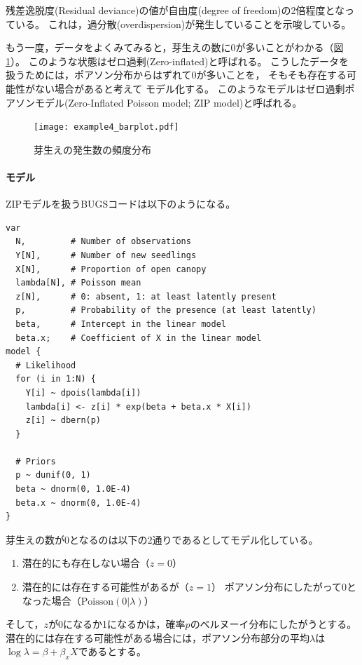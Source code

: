 \documentclass[11pt,uplatex]{jsarticle}
\begin{document}
残差逸脱度(Residual deviance)の値が自由度(degree of freedom)の2倍程度となっている。
これは，過分散(overdispersion)が発生していることを示唆している。

もう一度，データをよくみてみると，芽生えの数に0が多いことがわかる（図\ref{example4_barplot}）。
このような状態はゼロ過剰(Zero-inflated)と呼ばれる。
こうしたデータを扱うためには，ポアソン分布からはずれて0が多いことを，
そもそも存在する可能性がない場合があると考えて
モデル化する。
このようなモデルはゼロ過剰ポアソンモデル(Zero-Inflated Poisson model; ZIP model)と呼ばれる。

\begin{figure}[hbtp]
  \begin{center}
    \texttt{[image: example4\_barplot.pdf]}
  \end{center}
  \caption{芽生えの発生数の頻度分布}
  \label{example4_barplot}
\end{figure}


\paragraph{モデル}
ZIPモデルを扱うBUGSコードは以下のようになる。

\begin{lstlisting}
var
  N,         # Number of observations
  Y[N],      # Number of new seedlings
  X[N],      # Proportion of open canopy
  lambda[N], # Poisson mean
  z[N],      # 0: absent, 1: at least latently present
  p,         # Probability of the presence (at least latently)
  beta,      # Intercept in the linear model
  beta.x;    # Coefficient of X in the linear model
model {
  # Likelihood
  for (i in 1:N) {
    Y[i] ~ dpois(lambda[i])
    lambda[i] <- z[i] * exp(beta + beta.x * X[i])
    z[i] ~ dbern(p)
  }

  # Priors
  p ~ dunif(0, 1)
  beta ~ dnorm(0, 1.0E-4)
  beta.x ~ dnorm(0, 1.0E-4)
}
\end{lstlisting}


芽生えの数が0となるのは以下の2通りであるとしてモデル化している。
\begin{enumerate}
\item 潜在的にも存在しない場合（$z=0$）
\item 潜在的には存在する可能性があるが（$z=1$）
ポアソン分布にしたがって0となった場合（$\mathrm{Poisson}(0|\lambda)$）
\end{enumerate}
そして，$z$が0になるか1になるかは，確率$p$のベルヌーイ分布にしたがうとする。
潜在的には存在する可能性がある場合には，ポアソン分布部分の平均$\lambda$は
$\log\lambda = \beta + \beta_{x}X$であるとする。
\end{document}
